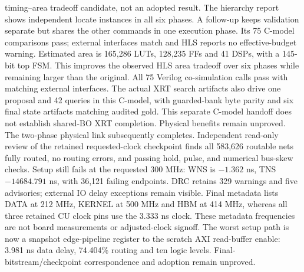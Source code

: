 \documentclass[10pt]{article}
\begin{document}
timing--area tradeoff candidate, not an adopted result.
The hierarchy report shows independent locate instances in all six
phases. A follow-up keeps validation separate but shares the other
commands in one execution phase. Its 75 C-model comparisons pass;
external interfaces match and HLS reports no effective-budget warning.
Estimated area is 165,286 LUTs, 128,235 FFs and 41 DSPs, with a
145-bit top FSM. This improves the observed HLS area tradeoff over
six phases while remaining larger than the original. All 75 Verilog
co-simulation calls pass with matching external interfaces. The actual
XRT search artifacts also drive one proposal and 42 queries in this
C-model, with guarded-bank byte parity and six final state artifacts
matching audited gold. This separate C-model handoff does not establish
shared-BO XRT completion. Physical benefits remain unproved.
The two-phase physical link subsequently completes. Independent read-only
review of the retained requested-clock checkpoint finds all 583,626
routable nets fully routed, no routing errors, and passing hold, pulse,
and numerical bus-skew checks. Setup still fails at the requested
300 MHz: WNS is $-1.362$ ns, TNS $-14684.791$ ns, with 36,121 failing
endpoints. DRC retains 329 warnings and five advisories; external IO
delay exceptions remain visible. Final metadata lists DATA at 212 MHz,
KERNEL at 500 MHz and HBM at 414 MHz, whereas all three retained CU
clock pins use the 3.333 ns clock. These metadata frequencies are not
board measurements or adjusted-clock signoff. The worst setup path is
now a snapshot edge-pipeline register to the scratch AXI read-buffer
enable: 3.981 ns data delay, 74.404\% routing and ten logic levels.
Final-bitstream/checkpoint correspondence and adoption remain unproved.
\end{document}
